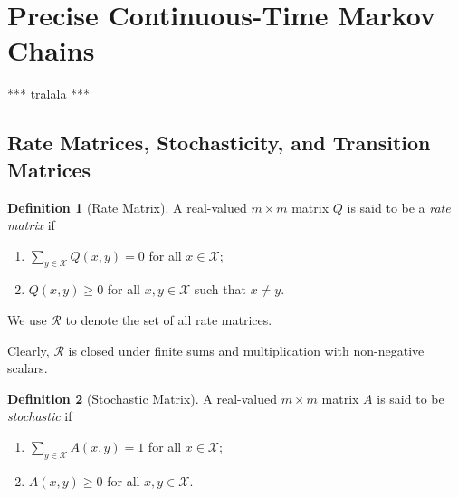 \documentclass[10pt]{paper}
\theoremstyle{definition}
\newtheorem{definition}{Definition}
\newcommand{\states}{\mathcal{X}}
\begin{document}
\section{Precise Continuous-Time Markov Chains}

*** tralala ***

\subsection{Rate Matrices, Stochasticity, and Transition Matrices}

\begin{definition}[Rate Matrix]\label{def:rate_matrix}
A real-valued $m\times m$ matrix $Q$ is said to be a \emph{rate matrix} if

\vspace{5pt}
\begin{enumerate}[label=R\arabic*:]
\item
$\sum_{y\in\states}Q(x,y)=0$ for all $x\in\states$;
\item
$Q(x,y)\geq0$ for all $x,y\in\states$ such that $x\neq y$.
\end{enumerate}
\vspace{5pt}
\noindent
We use $\mathcal{R}$ to denote the set of all rate matrices. 
\end{definition}

Clearly, $\mathcal{R}$ is closed under finite sums and multiplication with non-negative scalars. 

\begin{definition}[Stochastic Matrix]\label{def:stoch_matrix}
A real-valued $m\times m$ matrix $A$ is said to be \emph{stochastic} if
\vspace{5pt}
\begin{enumerate}[label=S\arabic*:]
\item
$\sum_{y\in\states}A(x,y)=1$ for all $x\in\states$;
\item
$A(x,y)\geq0$ for all $x,y\in\states$.
\end{enumerate}
\vspace{5pt}
\noindent
\end{definition}
\end{document}
